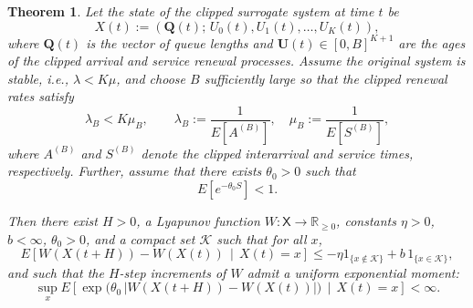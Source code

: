 \documentclass[11pt]{article}
\newcommand{\E}{E}
\newcommand{\R}{\mathbb{R}}
\newtheorem{theorem}{Theorem}
\begin{document}
\begin{theorem}
\label{thm:jsq-drift-exp}
Let the state of the \emph{clipped surrogate} system at time $t$ be
\[
X(t) := \left(\mathbf{Q}(t);\, U_0(t), U_1(t), \dots, U_{K}(t)\right),
\]
where $\mathbf{Q}(t)$ is the vector of queue lengths and
$\mathbf{U}(t) \in [0,B]^{K+1}$ are the ages of the clipped arrival and service renewal processes.
Assume the original system is stable, i.e., $\lambda<K\mu$, and choose $B$ sufficiently large so that
the clipped renewal rates satisfy
\[
\lambda_B < K\mu_B,
\qquad
\lambda_B := \frac{1}{\E[A^{(B)}]},\quad
\mu_B := \frac{1}{\E[S^{(B)}]},
\]
where $A^{(B)}$ and $S^{(B)}$ denote the clipped interarrival and service times, respectively. Further, assume that there exists
$\theta_0>0$ such that
\begin{equation}
\label{eq:laplace-cond}
\E\!\left[e^{-\theta_0 S}\right] < 1.
\end{equation}


Then there exist $H>0$, a Lyapunov function $W:\mathsf{X}\to\R_{\ge 0}$,
constants $\eta>0$, $b<\infty$, $\theta_0>0$, and a compact set $\mathcal{K}$
such that for all $x$,
\begin{equation}
\label{eq:drift-W}
\E\!\left[ W(X(t+H)) - W(X(t)) \,\middle|\, X(t)=x\right]
\le -\eta 1_{\{x\notin\mathcal K\}} + b\, 1_{\{x\in\mathcal K\}},
\end{equation}
and such that the $H$-step increments of $W$ admit a uniform exponential moment:
\begin{equation}
\label{eq:mgf-W}
\sup_x
\E\!\left[
\exp\!\big(\theta_0\,|W(X(t+H))-W(X(t))|\big)
\,\middle|\,
X(t)=x
\right]
< \infty.
\end{equation}
\end{theorem}
\end{document}
